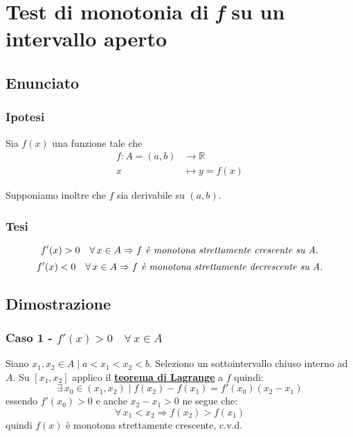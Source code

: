 \documentclass[../../analisi1]{subfiles}
\begin{document}
    \chapter{Test di monotonia di \emph{f} su un intervallo aperto}

        \section*{Enunciato}

        \subsection*{Ipotesi}

            Sia \(f(x)\) una funzione tale che
            \begin{align*}
                f : A = (a, b) &\longrightarrow \mathbb{R}\\
                x &\longmapsto y = f(x) 
            \end{align*}

            Supponiamo inoltre che \(f\) sia derivabile su \((a, b)\).

        \subsection*{Tesi}

            \[ f'(x) > 0 \quad \forall \, x \in A \Rightarrow f \text{\emph{ è monotona strettamente crescente su A.}}\]
            \[ f'(x) < 0 \quad \forall \, x \in A \Rightarrow f \text{\emph{ è monotona strettamente decrescente su A.}}\]

        \section*{Dimostrazione}

            \medskip

            \subsection*{Caso 1 - \( f'(x) > 0 \quad \forall \, x \in A \)}

            Siano \(x_1, x_2 \in A \mid a < x_1 < x_2 < b \). Seleziono un sottointervallo chiuso interno ad \(A\).
            Su \( [x_1, x_2] \) applico il \textbf{\hyperref[teoLagrange]{teorema di Lagrange}} a \(f\) quindi:
            \[
                \exists \, x_0 \in (x_1, x_2) \mid f(x_2) - f(x_1) = f'(x_0)(x_2 - x_1) 
            \]
            essendo \( f'(x_0) > 0 \) e anche \( x_2 - x_1 > 0 \) ne segue che:
            \[
                \forall \, x_1 < x_2 \Rightarrow f(x_2) > f(x_1)
            \]
            quindi \(f(x)\) è monotona strettamente crescente, c.v.d.
\end{document}
